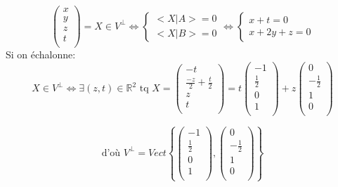 \documentclass{article}
\begin{document}
$$\begin{pmatrix}
    x\\
    y\\
    z\\
    t\\
\end{pmatrix} = X \in V^\perp \Leftrightarrow
\left\{
    \begin{array}{ll}
        <X|A> = 0\\
        <X|B> = 0
    \end{array}
\right. \Leftrightarrow
\left\{
    \begin{array}{ll}
        x + t = 0\\
        x + 2y + z = 0
    \end{array}
\right.$$
Si on échalonne:
$$X \in V^\perp \Leftrightarrow \exists(z, t) \in \mathbb{R}^2 \mbox{ tq } X = \begin{pmatrix}
    -t\\
    \frac{-z}{2} + \frac{t}{2}\\
    z\\
    t\\
\end{pmatrix} = t \begin{pmatrix}
    -1\\
    \frac{1}{2}\\
    0\\
    1\\
\end{pmatrix} + z \begin{pmatrix}
    0\\
    -\frac{1}{2}\\
    1\\
    0\\
\end{pmatrix}$$

$$\mbox{d'où } V^\perp = Vect \left\{
    \begin{pmatrix}
        -1\\
        \frac{1}{2}\\
        0\\
        1\\
    \end{pmatrix}, \begin{pmatrix}
        0\\
        -\frac{1}{2}\\
        1\\
        0\\
    \end{pmatrix}
\right\}$$
\end{document}
